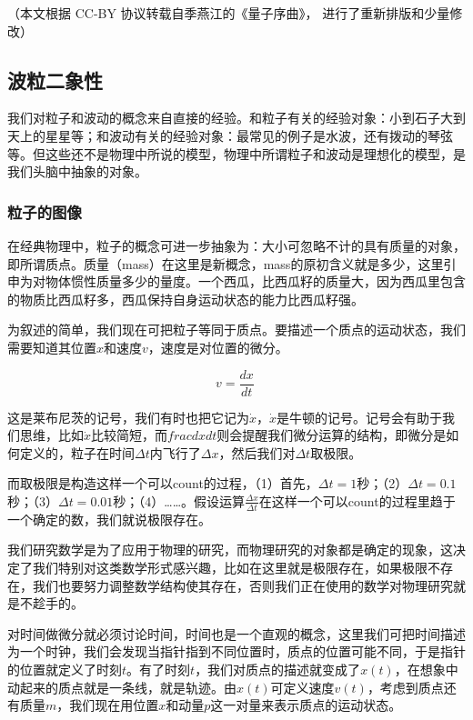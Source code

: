 
（本文根据 CC-BY 协议转载自季燕江的《量子序曲》， 进行了重新排版和少量修改）

\subsection{波粒二象性}


我们对粒子和波动的概念来自直接的经验。和粒子有关的经验对象：小到石子大到天上的星星等；和波动有关的经验对象：最常见的例子是水波，还有拨动的琴弦等。但这些还不是物理中所说的模型，物理中所谓粒子和波动是理想化的模型，是我们头脑中抽象的对象。


\subsubsection{粒子的图像}


在经典物理中，粒子的概念可进一步抽象为：大小可忽略不计的具有质量的对象，即所谓质点。质量（mass）在这里是新概念，mass的原初含义就是多少，这里引申为对物体惯性质量多少的量度。一个西瓜，比西瓜籽的质量大，因为西瓜里包含的物质比西瓜籽多，西瓜保持自身运动状态的能力比西瓜籽强。

为叙述的简单，我们现在可把粒子等同于质点。要描述一个质点的运动状态，我们需要知道其位置$x$和速度$v$，速度是对位置的微分。

\begin{equation}
v = \frac{d x}{d t}~
\end{equation}

这是莱布尼茨的记号，我们有时也把它记为$\dot x$，$\dot x$是牛顿的记号。记号会有助于我们思维，比如$\dot x$比较简短，而$frac{d x}{d t}$则会提醒我们微分运算的结构，即微分是如何定义的，粒子在时间$\Delta t$内飞行了$\Delta x$，然后我们对$\Delta t$取极限。

而取极限是构造这样一个可以count的过程，（1）首先，$\Delta t = 1$秒；（2）$\Delta t = 0.1$秒；（3）$\Delta t = 0.01$秒；（4）……。假设运算$\frac{\Delta x }{\Delta t}$在这样一个可以count的过程里趋于一个确定的数，我们就说极限存在。

我们研究数学是为了应用于物理的研究，而物理研究的对象都是确定的现象，这决定了我们特别对这类数学形式感兴趣，比如在这里就是极限存在，如果极限不存在，我们也要努力调整数学结构使其存在，否则我们正在使用的数学对物理研究就是不趁手的。

对时间做微分就必须讨论时间，时间也是一个直观的概念，这里我们可把时间描述为一个时钟，我们会发现当指针指到不同位置时，质点的位置可能不同，于是指针的位置就定义了时刻$t$。有了时刻$t$，我们对质点的描述就变成了$x(t)$，在想象中动起来的质点就是一条线，就是轨迹。由$x(t)$可定义速度$v(t)$，考虑到质点还有质量$m$，我们现在用位置$x$和动量$p$这一对量来表示质点的运动状态。

